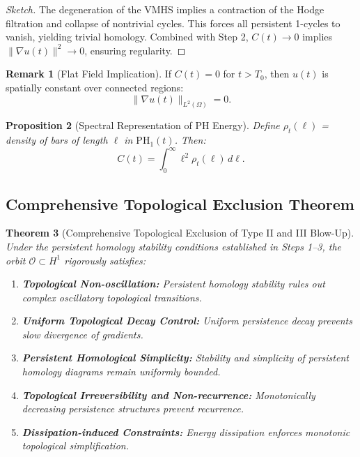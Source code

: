 \documentclass[11pt]{article}
\newtheorem{theorem}{Theorem}[section]
\newtheorem{proposition}[theorem]{Proposition}
\theoremstyle{definition}
\newtheorem{remark}[theorem]{Remark}
\begin{document}
\begin{proof}[Sketch]
The degeneration of the VMHS implies a contraction of the Hodge filtration and collapse of nontrivial cycles. This forces all persistent 1-cycles to vanish, yielding trivial homology. Combined with Step 2, $C(t) \to 0$ implies $\|\nabla u(t)\|^2 \to 0$, ensuring regularity.
\end{proof}

\begin{remark}[Flat Field Implication]
If $C(t) = 0$ for $t > T_0$, then $u(t)$ is spatially constant over connected regions:
\[
\|\nabla u(t)\|_{L^2(\Omega)} = 0.
\]
\end{remark}

\begin{proposition}[Spectral Representation of PH Energy]
Define $\rho_t(\ell)$ = density of bars of length $\ell$ in $\mathrm{PH}_1(t)$. Then:
\[
C(t) = \int_0^\infty \ell^2 \rho_t(\ell) \, d\ell.
\]
\end{proposition}

\subsection*{Comprehensive Topological Exclusion Theorem}

\begin{theorem}[Comprehensive Topological Exclusion of Type II and III Blow-Up]
\label{thm:comprehensive_exclusion}
Under the persistent homology stability conditions established in Steps 1--3, the orbit $\mathcal{O} \subset H^1$ rigorously satisfies:
\begin{enumerate}
  \item \textbf{Topological Non-oscillation:} Persistent homology stability rules out complex oscillatory topological transitions.
  \item \textbf{Uniform Topological Decay Control:} Uniform persistence decay prevents slow divergence of gradients.
  \item \textbf{Persistent Homological Simplicity:} Stability and simplicity of persistent homology diagrams remain uniformly bounded.
  \item \textbf{Topological Irreversibility and Non-recurrence:} Monotonically decreasing persistence structures prevent recurrence.
  \item \textbf{Dissipation-induced Constraints:} Energy dissipation enforces monotonic topological simplification.
\end{enumerate}
\end{theorem}
\end{document}
